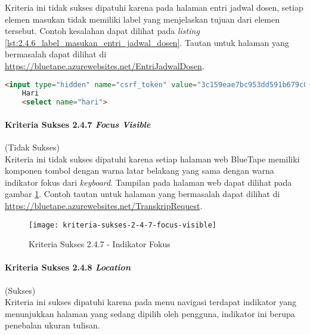 Kriteria ini tidak sukses dipatuhi karena pada halaman entri jadwal dosen, setiap elemen masukan tidak memiliki label yang menjelaskan tujuan dari elemen tersebut. Contoh kesalahan dapat dilihat pada \textit{listing} \ref{lst:2.4.6_label_masukan_entri_jadwal_dosen}. Tautan untuk halaman yang bermasalah dapat dilihat di \url{https://bluetape.azurewebsites.net/EntriJadwalDosen}.

\begin{lstlisting}[frame=single, label={lst:2.4.6_label_masukan_entri_jadwal_dosen}, language=HTML, caption=Kriteria Sukses 2.4.6 - Tidak Terdapat Label pada Kolom Masukan di Halaman Entri Jadwal Dosen]
    <input type="hidden" name="csrf_token" value="3c159eae7bc953dd591b679c080ed066"/>
    Hari
    <select name="hari">
\end{lstlisting}

\paragraph{Kriteria Sukses 2.4.7 \textit{Focus Visible}}
\label{par:kepatuhan_bluetape_kriteria_sukses_2.4.7}
(Tidak Sukses)\\

Kriteria ini tidak sukses dipatuhi karena setiap halaman web BlueTape memiliki komponen tombol dengan warna latar belakang yang sama dengan warna indikator fokus dari \textit{keyboard}. Tampilan pada halaman web dapat dilihat pada gambar \ref{fig:2.4.7_focus_visible}. Contoh tautan untuk halaman yang bermasalah dapat dilihat di \url{https://bluetape.azurewebsites.net/TranskripRequest}. 

\begin{figure}[H]
    \centering  
    \texttt{[image: kriteria-sukses-2-4-7-focus-visible]}  
    \caption[Kriteria Sukses 2.4.7 - Indikator Fokus]{Kriteria Sukses 2.4.7 - Indikator Fokus}
    \label{fig:2.4.7_focus_visible}  
\end{figure}

\paragraph{Kriteria Sukses 2.4.8 \textit{Location}}
\label{par:kepatuhan_bluetape_kriteria_sukses_2.4.8}
(Sukses)\\

Kriteria ini sukses dipatuhi karena pada menu navigasi terdapat indikator yang menunjukkan halaman yang sedang dipilih oleh pengguna, indikator ini berupa penebalan ukuran tulisan.


